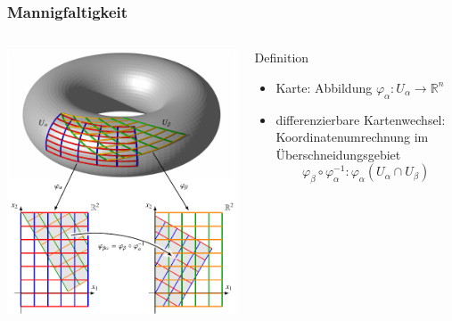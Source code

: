 %
%
%
\bgroup
\begin{frame}[t]
\setlength{\abovedisplayskip}{5pt}
\setlength{\belowdisplayskip}{5pt}
\frametitle{Mannigfaltigkeit}
\vspace{-20pt}
\begin{columns}[t,onlytextwidth]
\begin{column}{0.48\textwidth}
\begin{center}
\includegraphics[width=\textwidth]{../../buch/chapters/60-gruppen/images/karten.pdf}
\end{center}
\end{column}
\begin{column}{0.48\textwidth}
\begin{block}{Definition}
\begin{itemize}
\item Karte: Abbildung $\varphi_\alpha\colon U_\alpha\to\mathbb{R}^n$
\item differenzierbare Kartenwechsel: Koordinatenumrechnung im Überschneidungsgebiet
\[
\varphi_\beta\circ\varphi_\alpha^{-1}
\colon
\varphi_\alpha(U_\alpha\cap U_\beta)
\]
\end{itemize}
\end{block}
\end{column}
\end{columns}
\end{frame}
